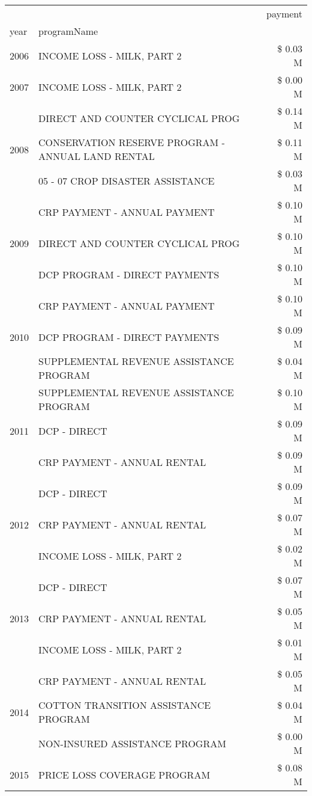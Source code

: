 \begin{tabular}{llr}
\toprule
 &  & payment \\
year & programName &  \\
\midrule
2006 & INCOME LOSS - MILK, PART 2 & \$ 0.03 M \\
\cline{1-3}
2007 & INCOME LOSS - MILK, PART 2 & \$ 0.00 M \\
\cline{1-3}
\multirow[t]{3}{*}{2008} & DIRECT AND COUNTER CYCLICAL PROG & \$ 0.14 M \\
 & CONSERVATION RESERVE PROGRAM - ANNUAL LAND RENTAL & \$ 0.11 M \\
 & 05 - 07 CROP DISASTER ASSISTANCE & \$ 0.03 M \\
\cline{1-3}
\multirow[t]{3}{*}{2009} & CRP PAYMENT - ANNUAL PAYMENT & \$ 0.10 M \\
 & DIRECT AND COUNTER CYCLICAL PROG & \$ 0.10 M \\
 & DCP PROGRAM - DIRECT PAYMENTS & \$ 0.10 M \\
\cline{1-3}
\multirow[t]{3}{*}{2010} & CRP PAYMENT - ANNUAL PAYMENT & \$ 0.10 M \\
 & DCP PROGRAM - DIRECT PAYMENTS & \$ 0.09 M \\
 & SUPPLEMENTAL REVENUE ASSISTANCE PROGRAM & \$ 0.04 M \\
\cline{1-3}
\multirow[t]{3}{*}{2011} & SUPPLEMENTAL REVENUE ASSISTANCE PROGRAM & \$ 0.10 M \\
 & DCP - DIRECT & \$ 0.09 M \\
 & CRP PAYMENT - ANNUAL RENTAL & \$ 0.09 M \\
\cline{1-3}
\multirow[t]{3}{*}{2012} & DCP - DIRECT & \$ 0.09 M \\
 & CRP PAYMENT - ANNUAL RENTAL & \$ 0.07 M \\
 & INCOME LOSS - MILK, PART 2 & \$ 0.02 M \\
\cline{1-3}
\multirow[t]{3}{*}{2013} & DCP - DIRECT & \$ 0.07 M \\
 & CRP PAYMENT - ANNUAL RENTAL & \$ 0.05 M \\
 & INCOME LOSS - MILK, PART 2 & \$ 0.01 M \\
\cline{1-3}
\multirow[t]{3}{*}{2014} & CRP PAYMENT - ANNUAL RENTAL & \$ 0.05 M \\
 & COTTON TRANSITION ASSISTANCE PROGRAM & \$ 0.04 M \\
 & NON-INSURED ASSISTANCE PROGRAM & \$ 0.00 M \\
\cline{1-3}
\multirow[t]{3}{*}{2015} & PRICE LOSS COVERAGE PROGRAM & \$ 0.08 M \\

\end{tabular}
